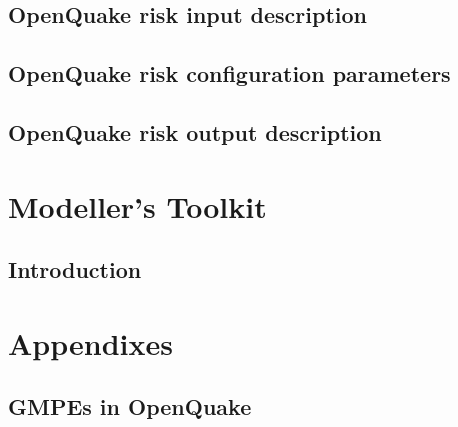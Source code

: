 \documentclass[12pt,a4paper,headings=small,version=first,dvips]{scrbook}
\begin{document}
\chapter{OpenQuake risk input description}
	\label{chap:riskinp}
	
%	
	
\chapter{OpenQuake risk configuration parameters}	
	\label{chap:riskconfigpar}
		

\chapter{OpenQuake risk output description}	
	\label{chap:riskout}
		
	
\part{Modeller's Toolkit}
\chapter{Introduction}
	
\part{Appendixes}
\appendix
\chapter{GMPEs in OpenQuake}
	
\end{document}
